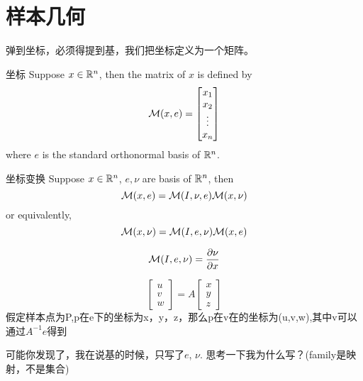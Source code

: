 \section{样本几何}
弹到坐标，必须得提到基，我们把坐标定义为一个矩阵。
\begin{sdefinition}{坐标}{}
Suppose $x \in \mathbb{R}^n$, then the matrix of $x$ is defined by
$$
\mathcal{M}(x,e) = \begin{bmatrix}
	x_1 \\
	x_2 \\
	\vdots \\
	x_n
\end{bmatrix}
$$
where $e$ is the standard orthonormal basis of $\mathbb{R}^n$.

\end{sdefinition}

\begin{stheorem}{坐标变换}{}
Suppose $x \in \mathbb{R}^n$, $e,\nu$ are basis of $\mathbb{R}^n$, then
$$
\mathcal{M}(x,e) = \mathcal{M}(I,\nu,e) \mathcal{M}(x,\nu)
$$
or equivalently,
$$
\mathcal{M}(x,\nu) = \mathcal{M}(I,e,\nu) \mathcal{M}(x,e)
$$
\end{stheorem}

\begin{sdefinition}{}{}
$$
\mathcal{M}(I,e,\nu) = \frac{\partial \nu}{\partial x} 
$$	
\end{sdefinition}

\begin{sexample}{}{}
$$
\begin{bmatrix}
	u \\
	v \\
	w 
\end{bmatrix}
= A \begin{bmatrix}
	x \\
	y \\
	z
\end{bmatrix}
$$
假定样本点为P,p在e下的坐标为x，y，z，那么p在v在的坐标为(u,v,w),其中v可以通过$A^{-1}e$得到
\end{sexample}

\begin{sremark}{}{}
可能你发现了，我在说基的时候，只写了$e$, $\nu$. 思考一下我为什么写？(family是映射，不是集合)
\end{sremark}
